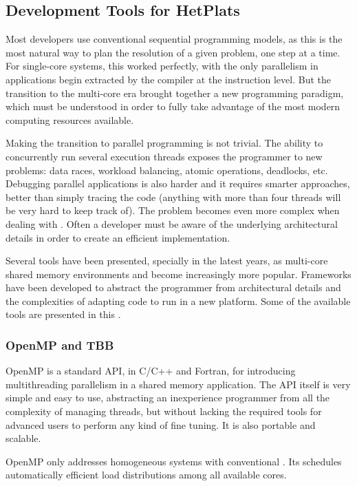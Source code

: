 \subsection{Development Tools for \aclp{HetPlat}}
\label{sec:techbg:software}
Most developers use conventional sequential programming models, as this is the most natural way to plan the resolution of a given problem, one step at a time. For single-core systems, this worked perfectly, with the only parallelism in applications begin extracted by the compiler at the instruction level. But the transition to the multi-core era brought together a new programming paradigm, which must be understood in order to fully take advantage of the most modern computing resources available.

Making the transition to parallel programming is not trivial. The ability to concurrently run several execution threads exposes the programmer to new problems: data races, workload balancing, atomic operations, deadlocks, etc. Debugging parallel applications is also harder and it requires smarter approaches, better than simply tracing the code (anything with more than four threads will be very hard to keep track of). The problem becomes even more complex when dealing with \hetplats. Often a developer must be aware of the underlying architectural details in order to create an efficient implementation.

Several tools have been presented, specially in the latest years, as multi-core shared memory environments and \hetplats become increasingly more popular. Frameworks have been developed to abstract the programmer from architectural details and the complexities of adapting code to run in a new platform. Some of the available tools are presented in this .

\subsubsection{OpenMP and \acs{TBB}}
OpenMP\cite{OpenMP:3.1} is a standard API, in C/C++ and Fortran, for introducing multithreading parallelism in a shared memory application. The API itself is very simple and easy to use, abstracting an inexperience programmer from all the complexity of managing threads, but without lacking the required tools for advanced users to perform any kind of fine tuning. It is also portable and scalable.

OpenMP only addresses homogeneous systems with conventional \cpus. Its schedules automatically efficient load distributions among all available cores.

